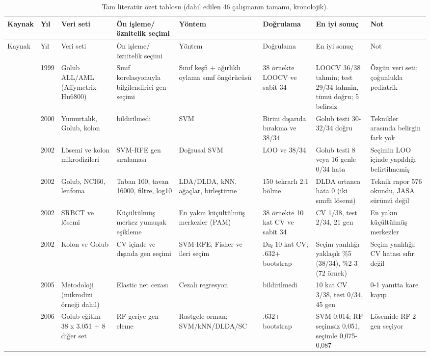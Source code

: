 \begin{longtable}{@{}p{0.9cm}p{0.5cm}p{2.3cm}p{2.6cm}p{2.6cm}p{2.3cm}p{2.6cm}p{2.4cm}@{}}
\caption{Tam literatür özet tablosu (dahil edilen 46 çalışmanın tamamı, kronolojik).}\label{tab:litfull}\\
\toprule Kaynak & Yıl & Veri seti & Ön işleme/öznitelik seçimi & Yöntem & Doğrulama & En iyi sonuç & Not\\ \midrule\endfirsthead
\toprule Kaynak & Yıl & Veri seti & Ön işleme/öznitelik seçimi & Yöntem & Doğrulama & En iyi sonuç & Not\\ \midrule\endhead
\cite{golub1999} & 1999 & Golub ALL/AML (Affymetrix Hu6800) & Sınıf korelasyonuyla bilgilendirici gen seçimi & Sınıf keşfi + ağırlıklı oylama sınıf öngörücüsü & 38 örnekte LOOCV ve sabit 34 & LOOCV 36/38 tahmin; test 29/34 tahmin, tümü doğru; 5 belirsiz & Özgün veri seti; çoğunlukla pediatrik\\
\cite{furey2000} & 2000 & Yumurtalık, Golub, kolon & bildirilmedi & SVM & Birini dışarıda bırakma ve 38/34 & Golub testi 30-32/34 doğru & Teknikler arasında belirgin fark yok\\
\cite{guyon2002} & 2002 & Lösemi ve kolon mikrodizileri & SVM-RFE gen sıralaması & Doğrusal SVM & LOO ve 38/34 & Golub testi 8 veya 16 genle 0/34 hata & Seçimin LOO içinde yapıldığı belirtilmemiş\\
\cite{dudoit2002} & 2002 & Golub, NCI60, lenfoma & Taban 100, tavan 16000, filtre, log10 & LDA/DLDA, kNN, ağaçlar, birleştirme & 150 tekrarlı 2:1 bölme & DLDA ortanca hata 0 (iki sınıflı lösemi) & Teknik rapor 576 okundu, JASA sürümü değil\\
\cite{tibshirani2002} & 2002 & SRBCT ve lösemi & Küçültülmüş merkez yumuşak eşikleme & En yakın küçültülmüş merkezler (PAM) & 38 örnekte 10 kat CV ve sabit 34 & CV 1/38, test 2/34, 21 gen & En yakın küçültülmüş merkezler\\
\cite{ambroise2002} & 2002 & Kolon ve Golub & CV içinde ve dışında gen seçimi & SVM-RFE; Fisher ve ileri seçim & Dış 10 kat CV; .632+ bootstrap & Seçim yanlılığı yaklaşık \%5 (38/34), \%2-3 (72 örnek) & Seçim yanlılığı; CV hatası sıfır değil\\
\cite{zou2005} & 2005 & Metodoloji (mikrodizi örneği dahil) & Elastic net cezası & Cezalı regresyon & bildirilmedi & 10 kat CV 3/38, test 0/34, 45 gen & 0-1 yanıtta kare kayıp\\
\cite{diazuriarte2006} & 2006 & Golub eğitim 38 x 3.051 + 8 diğer set & RF geriye gen eleme & Rastgele orman; SVM/kNN/DLDA/SC & .632+ bootstrap & SVM 0,014; RF seçimsiz 0,051, seçimle 0,075-0,087 & Lösemide RF 2 gen seçiyor\\

\end{longtable}
